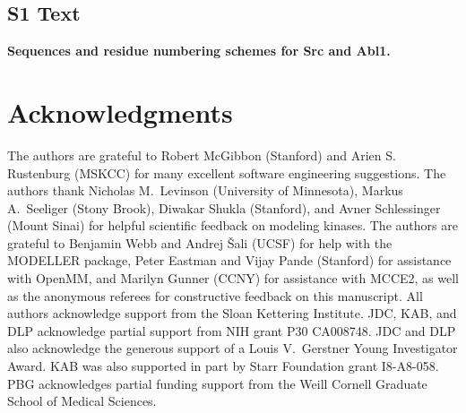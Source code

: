 \documentclass[10pt,letterpaper]{article}
\begin{document}
\subsection*{S1 Text}
\label{S1_Text}
{\bf Sequences and residue numbering schemes for Src and Abl1.}

\section*{Acknowledgments}
\label{section:acknowledgments}

The authors are grateful to Robert McGibbon (Stanford) and Arien S. Rustenburg (MSKCC) for many excellent software engineering suggestions.
The authors thank Nicholas M.~Levinson (University of Minnesota), Markus A.~Seeliger (Stony Brook), Diwakar Shukla (Stanford), and Avner Schlessinger (Mount Sinai) for helpful scientific feedback on modeling kinases.
The authors are grateful to Benjamin Webb and Andrej \v{S}ali (UCSF) for help with the MODELLER package, Peter Eastman and Vijay Pande (Stanford) for assistance with OpenMM, and Marilyn Gunner (CCNY) for assistance with MCCE2, as well as the anonymous referees for constructive feedback on this manuscript.
All authors acknowledge support from the Sloan Kettering Institute.
JDC, KAB, and DLP acknowledge partial support from NIH grant P30 CA008748.
JDC and DLP also acknowledge the generous support of a Louis V.~Gerstner Young Investigator Award.
KAB was also supported in part by Starr Foundation grant I8-A8-058.
PBG acknowledges partial funding support from the Weill Cornell Graduate School of Medical Sciences.

\nolinenumbers

%
%
% 

% 
\end{document}
